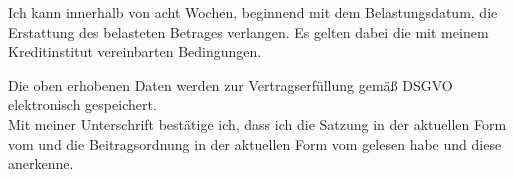 \documentclass[paper=a4,twoside=false,DIV=15,fontsize=11pt,parskip=half]{scrartcl}
\begin{document}
\begin{Form}
Ich kann innerhalb von acht Wochen, beginnend mit dem Belastungsdatum, die Erstattung des belasteten Betrages verlangen.
Es gelten dabei die mit meinem Kreditinstitut vereinbarten Bedingungen.

Die oben erhobenen Daten werden zur Vertragserfüllung gemäß DSGVO elektronisch gespeichert.\\[-\baselineskip]

Mit meiner Unterschrift bestätige ich, dass ich die Satzung in der aktuellen Form vom \datumsatzung und die Beitragsordnung in der aktuellen Form vom \datumbeitrago gelesen habe und diese anerkenne.\\

\vspace{0.5cm}

 \hfill {}\\[0.5mm]

\end{Form}
\end{document}
